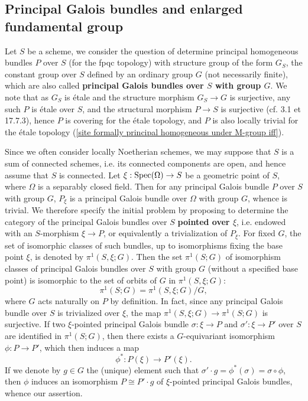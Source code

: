 \subsection{Principal Galois bundles and enlarged fundamental group}
Let $S$ be a scheme, we consider the question of determine principal homogeneous bundles $P$ over $S$ (for the fpqc topology) with structure group of the form $G_S$, the constant group over $S$ defined by an ordinary group $G$ (not necessarily finite), which are also called \textbf{principal Galois bundles over $S$ with group $G$}. We note that as $G_S$ is \'etale and the structure morphism $G_S\to G$ is surjective, any such $P$ is \'etale over $S$, and the structural morphism $P\to S$ is surjective (cf. \cite{SGA1}  3.1 et \cite{EGA4-4} 17.7.3), hence $P$ is covering for the \'etale topology, and $P$ is also locally trivial for the \'etale topology (\cref{site formally principal homogeneous under M-group iff}).\par
Since we often consider locally Noetherian schemes, we may suppose that $S$ is a sum of connected schemes, i.e. its connected components are open, and hence assume that $S$ is connected. Let $\xi:\mathrm{Spec}(\Omega)\to S$ be a geometric point of $S$, where $\Omega$ is a separably closed field. Then for any principal Galois bundle $P$ over $S$ with group $G$, $P_\xi$ is a principal Galois bundle over $\Omega$ with group $G$, whence is trivial. We therefore specify the initial problem by proposing to determine the category of the principal Galois bundles over $S$ \textbf{pointed over $\xi$}, i.e. endowed with an $S$-morphism $\xi\to P$, or equivalently a trivialization of $P_\xi$. For fixed $G$, the set of isomorphic classes of such bundles, up to isomorphisms fixing the base point $\xi$, is denoted by $\pi^1(S,\xi;G)$. Then the set $\pi^1(S;G)$ of isomorphism classes of principal Galois bundles over $S$ with group $G$ (without a specified base point) is isomorphic to the set of orbits of $G$ in $\pi^1(S,\xi;G)$:
\[\pi^1(S;G)=\pi^1(S,\xi;G)/G,\]
where $G$ acts naturally on $P$ by definition. In fact, since any principal Galois bundle over $S$ is trivialized over $\xi$, the map $\pi^1(S,\xi;G)\to\pi^1(S;G)$ is surjective. If two $\xi$-pointed principal Galois bundle $\sigma:\xi\to P$ and $\sigma':\xi\to P'$ over $S$ are identified in $\pi^1(S;G)$, then there exists a $G$-equivariant isomorphism $\phi:P\to P'$, which then induces a map
\[\phi^*:P(\xi)\to P'(\xi).\]
If we denote by $g\in G$ the (unique) element such that $\sigma'\cdot g=\phi^*(\sigma)=\sigma\circ\phi$, then $\phi$ induces an isomorphism $P\cong P'\cdot g$ of $\xi$-pointed principal Galois bundles, whence our assertion.\par
